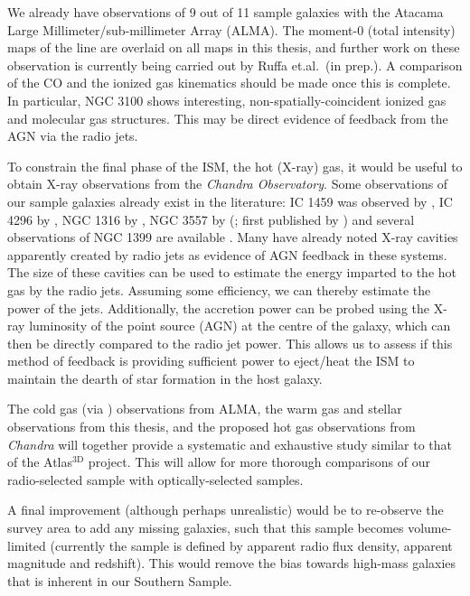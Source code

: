 	We already have observations of 9 out of 11 sample galaxies with the Atacama Large Millimeter/sub-millimeter Array (ALMA). The moment-0 (total intensity) maps of the  line are overlaid on all maps in this thesis, and further work on these observation is currently being carried out by Ruffa et.al.\ (in prep.). A comparison of the CO and the ionized gas kinematics should be made once this is complete. In particular, NGC 3100 shows interesting, non-spatially-coincident ionized gas and molecular gas structures. This may be direct evidence of feedback from the AGN via the radio jets. 

	To constrain the final phase of the ISM, the hot (X-ray) gas, it would be useful to obtain X-ray observations from the \textit{Chandra Observatory}. Some observations of our sample galaxies already exist in the literature: IC 1459 was observed by \citet{Fabbiano2003}, IC 4296 by \citet{Pellegrini2002}, NGC 1316 by \citet{Lanz2010}, NGC 3557 by \citeauthor{Ponman2001} (\citeyear{Ponman2001}; first published by \citealt{Balmaverde2005}) and several observations of NGC 1399 are available \citep[e.g.][]{Su2017}. Many have already noted X-ray cavities apparently created by radio jets as evidence of AGN feedback in these systems. The size of these cavities can be used to estimate the energy imparted to the hot gas by the radio jets. Assuming some efficiency, we can thereby estimate the power of the jets. Additionally, the accretion power can be probed using the X-ray luminosity of the point source (AGN) at the centre of the galaxy, which can then be directly compared to the radio jet power. This allows us to assess if this method of feedback is providing sufficient power to eject/heat the ISM to maintain the dearth of star formation in the host galaxy.

	The cold gas (via ) observations from ALMA, the warm gas and stellar observations from this thesis, and the proposed hot gas observations from \textit{Chandra} will together provide a systematic and exhaustive study similar to that of the Atlas$^\text{3D}$ project. This will allow for more thorough comparisons of our radio-selected sample with optically-selected samples.

	A final improvement (although perhaps unrealistic) would be to re-observe the survey area to add any missing galaxies, such that this sample becomes volume-limited (currently the sample is defined by apparent radio flux density, apparent magnitude and redshift). This would remove the bias towards high-mass galaxies that is inherent in our Southern Sample.
